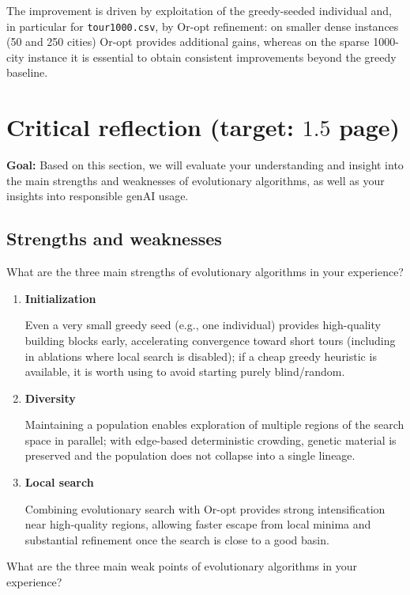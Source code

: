 \documentclass[a4paper,10pt]{article}
\newcommand{\ReplaceMe}[1]{{\color{blue}#1}}
\newcommand{\RemoveMe}[1]{{\color{purple}#1}}
\begin{document}
The improvement is driven by exploitation of the greedy-seeded individual and, in particular for \texttt{tour1000.csv}, by Or-opt refinement: on smaller dense instances (50 and 250 cities) Or-opt provides additional gains, whereas on the sparse 1000-city instance it is essential to obtain consistent improvements beyond the greedy baseline.


\section{Critical reflection \hfill(target: $1.5$ page)}

\RemoveMe{\textbf{Goal:} Based on this section, we will evaluate your understanding and insight into the main strengths and weaknesses of evolutionary algorithms, as well as your insights into responsible genAI usage.}

\subsection{Strengths and weaknesses}
\ReplaceMe{What are the three main strengths of evolutionary algorithms in your experience?}

\begin{enumerate}
  \item \textbf{Initialization}

  Even a very small greedy seed (e.g., one individual) provides high-quality building blocks early, accelerating convergence toward short tours (including in ablations where local search is disabled); if a cheap greedy heuristic is available, it is worth using to avoid starting purely blind/random.

  \item \textbf{Diversity}

  Maintaining a population enables exploration of multiple regions of the search space in parallel; with edge-based deterministic crowding, genetic material is preserved and the population does not collapse into a single lineage.

  \item \textbf{Local search}

  Combining evolutionary search with Or-opt provides strong intensification near high-quality regions, allowing faster escape from local minima and substantial refinement once the search is close to a good basin.

\end{enumerate}

\ReplaceMe{What are the three main weak points of evolutionary algorithms in your experience?}
\end{document}
